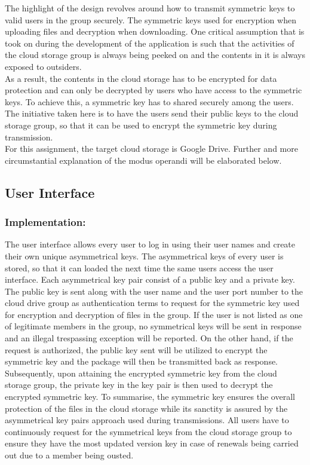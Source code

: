 \documentclass[12pt]{article}
\begin{document}
The highlight of the design revolves around how to transmit symmetric keys to valid users in the group securely. The symmetric keys used for encryption when uploading files and decryption when downloading. One critical assumption that is took on during the development of the application is such that the activities of the cloud storage group is always being peeked on and the contents in it is always exposed to outsiders. \\

As a result, the contents in the cloud storage has to be encrypted for data protection and can only be decrypted by users who have access to the symmetric keys. To achieve this, a symmetric key has to shared securely among the users. The initiative taken here is to have the users send their public keys to the cloud storage group, so that it can be used to encrypt the symmetric key during transmission. \\

For this assignment, the target cloud storage is Google Drive. Further and more circumstantial explanation of the modus operandi will be elaborated below.
\newpage
\subsection*{User Interface}
\subsubsection*{Implementation:}
The user interface allows every user to log in using their user names and create their own unique asymmetrical keys. The asymmetrical keys of every user is stored, so that it can loaded the next time the same users access the user interface. Each asymmetrical key pair consist of a public key and a private key. The public key is sent along with the user name and the user port number to the cloud drive group as authentication terms to request for the symmetric key used for encryption and decryption of files in the group. If the user is not listed as one of legitimate members in the group, no symmetrical keys will be sent in response and an illegal trespassing exception will be reported. On the other hand, if the request is authorized, the public key sent will be utilized to encrypt the symmetric key and the package will then be transmitted back as response. \\

Subsequently, upon attaining the encrypted symmetric key from the cloud storage group, the private key in the key pair is then used to decrypt the encrypted symmetric key. To summarise, the symmetric key ensures the overall protection of the files in the cloud storage while its sanctity is assured by the asymmetrical key pairs approach used during transmissions. All users have to continuously request for the symmetrical keys from the cloud storage group to ensure they have the most updated version key in case of renewals being carried out due to a member being ousted.\\
\end{document}
